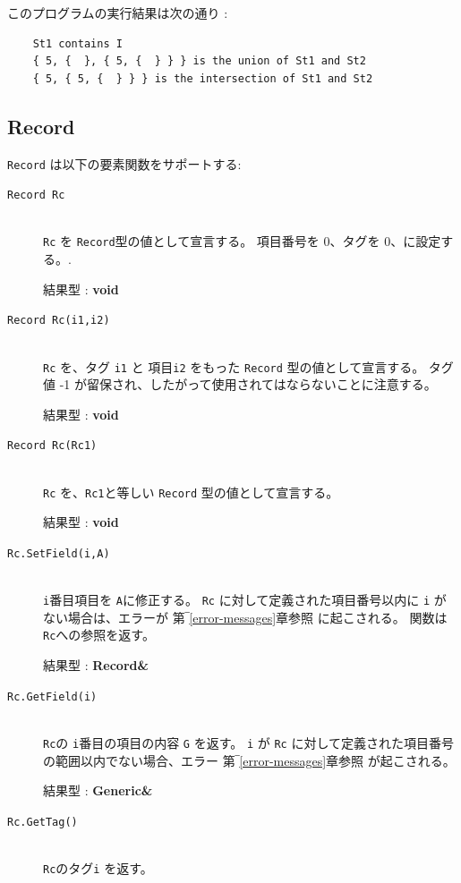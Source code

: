 \documentclass[\pformat,12pt]{jarticle}
\begin{document}
\noindent このプログラムの実行結果は次の通り :

\begin{verbatim}
    St1 contains I
    { 5, {  }, { 5, {  } } } is the union of St1 and St2
    { 5, { 5, {  } } } is the intersection of St1 and St2
\end{verbatim}

\subsection{Record}
{\tt Record} は以下の要素関数をサポートする:
\vspace{0.5cm}

\begin{description}
\item[{\tt Record Rc}] \mbox{}\\
      {\tt Rc} を {\tt Record}型の値として宣言する。
項目番号を 0、タグを 0、に設定する。.

    結果型 : {\bf void}

\item[{\tt Record Rc(i1,i2)}] \mbox{}\\
      {\tt Rc} を、タグ {\tt i1} と 項目{\tt i2} をもった {\tt Record} 型の値として宣言する。
タグ値 -1 が留保され、したがって使用されてはならないことに注意する。

     結果型 : {\bf void}

\item[{\tt Record Rc(Rc1)}] \mbox{}\\
      {\tt Rc} を、{\tt Rc1}と等しい {\tt Record} 型の値として宣言する。

     結果型 : {\bf void}

\item[{\tt Rc.SetField(i,A)}] \mbox{}\\
    {\tt i}番目項目を {\tt A}に修正する。
 {\tt Rc} に対して定義された項目番号以内に {\tt i} がない場合は、エラーが 第‾\ref{error-messages}章参照 に起こされる。 
    関数は{\tt Rc}への参照を返す。

     結果型 : {\bf Record\&}

\item[{\tt Rc.GetField(i)}] \mbox{}\\
   {\tt Rc}の  {\tt i}番目の項目の内容 {\tt G} を返す。
    {\tt i} が  {\tt Rc} に対して定義された項目番号の範囲以内でない場合、エラー 第‾\ref{error-messages}章参照 が起こされる。

     結果型 : {\bf Generic\&}

\item[{\tt Rc.GetTag()}] \mbox{}\\
   {\tt Rc}のタグ{\tt i} を返す。


\end{description}
\end{document}
